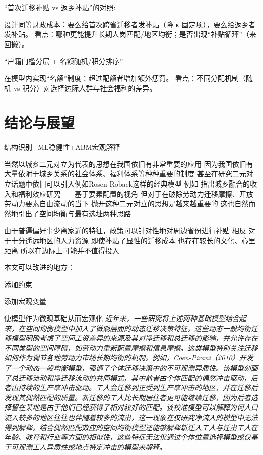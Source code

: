 \documentclass[
  a4paper,
  zihao=-4,
  fontset=mac,
  AutoFakeBold,
  AutoFakeSlant,
  oneside]{ctexbook}
\begin{document}
“首次迁移补贴 vs 返乡补贴”的对照:

设计同等财政成本：要么给首次跨省迁移者发补贴（降 
κ 固定项），要么给返乡者发补贴。
看点：哪种更能提升长期人岗匹配/地区均衡；是否出现“补贴循环”（来回搬）。

“户籍门槛分层 + 名额随机/积分排序”

在模型内实现“名额”制度：超过配额者增加额外惩罚。
看点：不同分配机制（随机 vs 积分）对选择边际人群与社会福利的差异。







\chapter{结论与展望}

结构识别+ML稳健性+ABM宏观解释


当然以城乡二元对立为代表的思想在我国依旧有非常重要的应用 因为我国依旧有大量依附于城乡关系的社会体系、福利体系等种种重要的制度
甚至在研究二元对立话题中依旧可以引入例如Rosen Roback这样的经典模型
例如 
\textcite{GuoDongMeiChengXiangRongHeDeShouRuHeFuLiXiaoYingYanJiuJiYuYaoSuPeiZhiDeShiJiao2023}指出城乡融合的收入和福利效应研究——基于要素配置的视角
但对于在破除劳动力迁移摩擦、开放劳动力要素自由流动的当下
抛开这种二元对立的思想是越来越重要的
这也自然而然地引出了空间均衡与最有选址两种思路



由于普遍偏好事少离家近的特征，政策可以针对性地对周边省份进行补贴
相反 对于十分遥远地区的人力资源 即使补贴了显性的迁移成本 也存在较长的文化、心里距离 所以在边际上可能并不值得投入



本文可以改进的地方：

添加约束

添加宏观变量

使模型作为微观基础从而宏观化
\textit{近年来，一些研究将上述两种基础模型结合起来，在空间均衡模型中加入了微观层面的动态迁移决策特征。这些动态一般均衡迁移模型明确考虑了空间工资差异的来源及其对净迁移和总迁移的影响，并允许存在不同类型的空间障碍，如劳动力重新配置摩擦和信息摩擦。这类模型特别关注迁移如何作为调节各地劳动力市场长期均衡的机制。例如，Coen-Pirani（2010）开发了一个动态一般均衡模型，强调了个体迁移决策中的不可观测异质性。该模型刻画了总迁移流动和净迁移流动的共同模式，其中前者由个体匹配的偶然冲击驱动，后者由持续的生产率冲击驱动。工人会迁移到正受到生产率冲击的地区，并在迁移后发现其偶然匹配的质量。新迁移的工人比长期居住者更可能继续迁移，因为后者选择留在某地是由于他们已经获得了相对较好的匹配。该校准模型可以解释为何人口流入较多的地区往往也伴随着较多的流出，这一现象在仅研究净流入的模型中无法得到解释。结合偶然匹配效应的空间均衡模型还能够解释新迁入工人与迁出工人在年龄、教育和行业等方面的相似性，这些特征无法仅通过个体位置选择模型或仅基于可观测工人异质性或地点特定冲击的模型来解释。}
\end{document}
